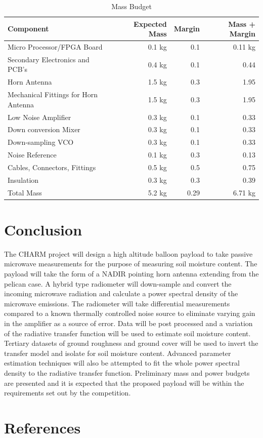 \documentclass[12pt]{article}
\begin{document}
\begin{table}[H]
	\centering
	\vspace{0.5cm}
	\renewcommand{\arraystretch}{1.3}
	\caption{Mass Budget }
	\label{tab:massBudget}
	\begin{tabularx}{\textwidth}{lrrr}
		\toprule
		Component & Expected Mass & Margin & Mass + Margin \\		
		\midrule
		Micro Processor/FPGA Board			&0.1 kg & 0.1& 0.11 kg \\ 
		Secondary Electronics and PCB's		&0.4 kg & 0.1& 0.44 \\
		Horn Antenna						&1.5 kg & 0.3& 1.95 \\ 
		Mechanical Fittings for Horn Antenna&1.5 kg & 0.3& 1.95 \\ 				
		Low Noise Amplifier					&0.3 kg & 0.1& 0.33 \\ 
		Down conversion Mixer		 		&0.3 kg & 0.1& 0.33 \\ 
		Down-sampling VCO			 		&0.3 kg & 0.1& 0.33 \\ 
		Noise Reference						&0.1 kg & 0.3& 0.13 \\
		Cables, Connectors, Fittings		&0.5 kg & 0.5& 0.75 \\
		Insulation							&0.3 kg & 0.3& 0.39 \\ 		\midrule
		Total Mass							&5.2 kg & 0.29& 6.71 kg
	\end{tabularx}	
\end{table}

\section{Conclusion}

The CHARM project will design a high altitude balloon payload to take passive microwave measurements for the purpose of measuring soil moisture content. The payload will take the form of a NADIR pointing horn antenna extending from the pelican case. A hybrid type radiometer will down-sample and convert the incoming microwave radiation and calculate a power spectral density of the microwave emissions. The radiometer will take differential measurements compared to a known thermally controlled noise source to eliminate varying gain in the amplifier as a source of error. Data will be post processed and a variation of the radiative transfer function will be used to estimate soil moisture content. Tertiary datasets of ground roughness and ground cover will be used to invert the transfer model and isolate for soil moisture content. Advanced parameter estimation techniques will also be attempted to fit the whole power spectral density to the radiative transfer function. Preliminary mass and power budgets are presented and it is expected that the proposed payload will be within the requirements set out by the competition.

\newpage
\section{References}


\end{document}
